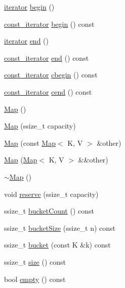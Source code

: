 \begin{DoxyCompactItemize}
\item 
\hyperlink{classMap_ad1f372a2028b9f46497e873b0e984e84}{iterator} \hyperlink{classMap_a34cb1bcee32679df8fd3b43f5260e4e9}{begin} ()
\item 
\hyperlink{classMap_add90fe1e25806ba6f6278b264e78ee9a}{const\+\_\+iterator} \hyperlink{classMap_ae14bb8eaf9dffd6b75b8cc0df481836a}{begin} () const
\item 
\hyperlink{classMap_ad1f372a2028b9f46497e873b0e984e84}{iterator} \hyperlink{classMap_af7192ef1dd6fb558c06442c00a4c516e}{end} ()
\item 
\hyperlink{classMap_add90fe1e25806ba6f6278b264e78ee9a}{const\+\_\+iterator} \hyperlink{classMap_a21f3b20a8a1492065dd775714c5ab8ef}{end} () const
\item 
\hyperlink{classMap_add90fe1e25806ba6f6278b264e78ee9a}{const\+\_\+iterator} \hyperlink{classMap_a489400386fcc9a5e8acd21fbf2c528a1}{cbegin} () const
\item 
\hyperlink{classMap_add90fe1e25806ba6f6278b264e78ee9a}{const\+\_\+iterator} \hyperlink{classMap_a40031f69b69e9bf0fe13319463f4251d}{cend} () const
\item 
\hyperlink{classMap_a06f9fc5d4c9a639994f8d8eb280ae7ed}{Map} ()
\item 
\hyperlink{classMap_a6a09ecf2e2b5a016be8f3034ef67c051}{Map} (ssize\+\_\+t capacity)
\item 
\hyperlink{classMap_afd84c24b9220a40dda8ef82aaf533710}{Map} (const \hyperlink{classMap}{Map}$<$ K, V $>$ \&other)
\item 
\hyperlink{classMap_adf81c5ca8314af5a2feeffd6a727ac65}{Map} (\hyperlink{classMap}{Map}$<$ K, V $>$ \&\&other)
\item 
\hyperlink{classMap_a6d8939f2cc39bf1f49ac76e32822e96c}{$\sim$\+Map} ()
\item 
void \hyperlink{classMap_a13b7b471133038741b63494407300df4}{reserve} (ssize\+\_\+t capacity)
\item 
ssize\+\_\+t \hyperlink{classMap_a7135028b2bcb299bd6dd71396cd5fb40}{bucket\+Count} () const
\item 
ssize\+\_\+t \hyperlink{classMap_ad78a1db4b42ed7c3d0f091cd3482b6de}{bucket\+Size} (ssize\+\_\+t n) const
\item 
ssize\+\_\+t \hyperlink{classMap_afb67ba82e34168ef9cc2c093e0782aee}{bucket} (const K \&k) const
\item 
ssize\+\_\+t \hyperlink{classMap_a69c355a6d393f859d830ddb3e476c8ec}{size} () const
\item 
bool \hyperlink{classMap_aabea9760ee5af9503c1230ad29cc4db7}{empty} () const

\end{DoxyCompactItemize}
